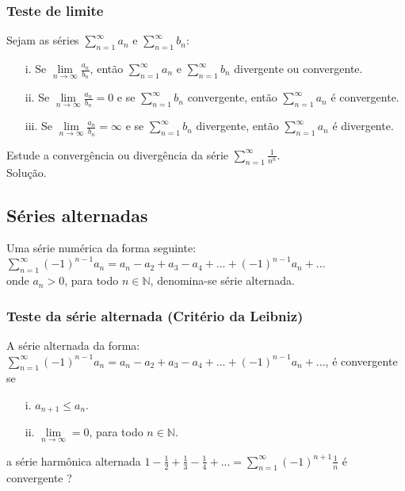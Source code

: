 \begin{ex}
\subsubsection{Teste de limite}
Sejam as séries $\sum_{n=1}^{\infty}a_{n}$ e $\sum_{n=1}^{\infty}b_{n}$: \\
\begin{itemize}
	\item[i.] Se $\lim\limits_{n\rightarrow \infty}\frac{a_{n}}{b_{n}}$, então $\sum_{n=1}^{\infty}a_{n}$ e $\sum_{n=1}^{\infty}b_{n}$ divergente ou convergente.
	\item[ii.] Se $\lim\limits_{n\rightarrow \infty}\frac{a_{n}}{b_{n}}=0$ e se $\sum_{n=1}^{\infty}b_{n}$ convergente, então $\sum_{n=1}^{\infty}a_{n}$ é convergente.
	\item[iii.] Se $\lim\limits_{n\rightarrow \infty}\frac{a_{n}}{b_{n}}=\infty$ e se $\sum_{n=1}^{\infty}b_{n}$ divergente, então $\sum_{n=1}^{\infty}a_{n}$ é divergente.
\end{itemize} 
\begin{ex}
	Estude a convergência ou divergência da série $\sum_{n=1}^{\infty}\frac{1}{n^{n}}$.\\
	Solução.
\end{ex}
\vspace*{7cm}
\subsection{Séries alternadas}
Uma série numérica da forma seguinte:\\

$\sum_{n=1}^{\infty}(-1)^{n-1}a_{n}=a_{n}-a_{2}+a_{3}-a_{4}+...+(-1)^{n-1}a_{n}+...$\\
onde $a_{n}>0$, para todo $n\in \mathbb{N}$, denomina-se série alternada.
\subsubsection{Teste da série alternada (Critério da Leibniz)} 

A série alternada da forma: \\

$\sum_{n=1}^{\infty}(-1)^{n-1}a_{n}=a_{n}-a_{2}+a_{3}-a_{4}+...+(-1)^{n-1}a_{n}+...$, é convergente se 
\begin{itemize}
	\item[i.] $a_{n+1}\leq a_{n}$.
	\item[ii.] $\lim\limits_{n\rightarrow\infty}=0$, para todo $n\in\mathbb{N}$.
\end{itemize} 
\begin{ex}
	a série harmônica alternada $1-\frac{1}{2}+\frac{1}{3}-\frac{1}{4}+...=\sum_{n=1}^{\infty}(-1)^{n+1}\frac{1}{n}$ é convergente ?
	

\end{ex}
\end{ex}
